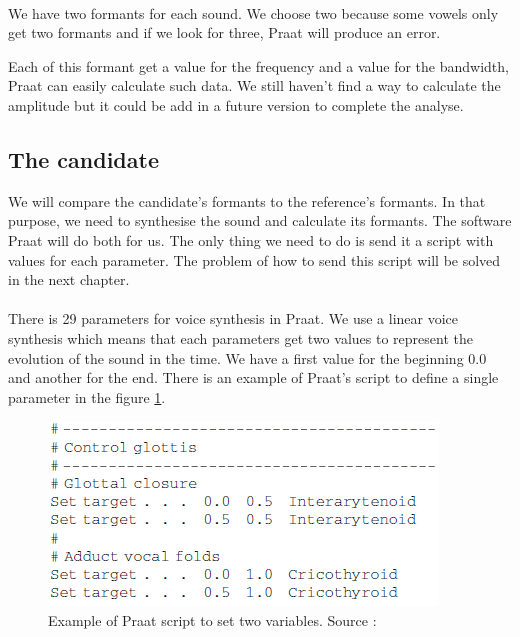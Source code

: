 \documentclass[12pt]{report}
\begin{document}
\paragraph*{}
We have two formants for each sound. We choose two because some vowels only get two formants and if we look for three, Praat will produce an error.

Each of this formant get a value for the frequency and a value for the bandwidth, Praat can easily calculate such data. We still haven't find a way to calculate the amplitude but it could be add in a future version to complete the analyse.

\subsection{The candidate}
\label{Thecandidate}
We will compare the candidate's formants to the reference's formants. In that purpose, we need to synthesise the sound and calculate its formants. The software Praat\cite{ref1} will do both for us. The only thing we need to do is send it a script with values for each parameter. The problem of how to send this script will be solved in the next chapter.

\paragraph*{}
There is 29 parameters for voice synthesis in Praat. We use a linear voice synthesis which means that each parameters get two values to represent the evolution of the sound in the time.  We have a first value for the beginning 0.0 and another for the end. There is an example of Praat's script to define a single parameter in the figure \ref{praatScript}.

\begin{figure}[h]
\begin{center}
\includegraphics{resources/praatScript.png} 
\end{center}
\caption{Example of Praat script to set two variables. Source : \cite{ref5}}
\label{praatScript}
\end{figure}
\end{document}
